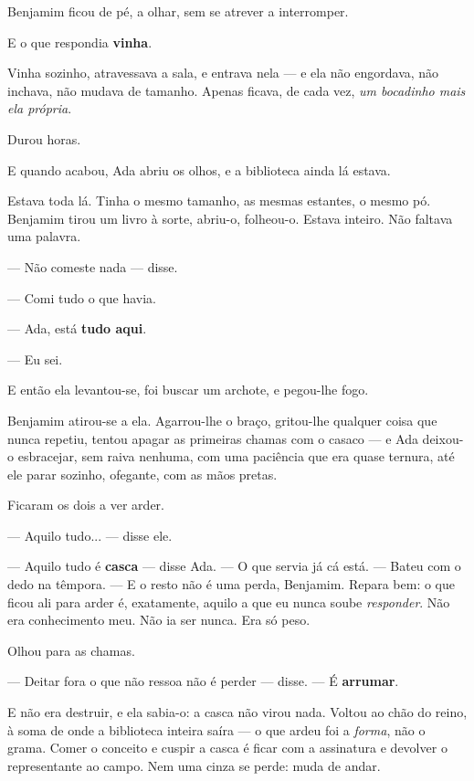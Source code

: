 \documentclass[livro.tex]{subfiles}
\begin{document}
Benjamim ficou de pé, a olhar, sem se atrever a interromper.

E o que respondia \textbf{vinha}.

Vinha sozinho, atravessava a sala, e entrava nela --- e ela não engordava, não inchava, não mudava de tamanho.
Apenas ficava, de cada vez, \emph{um bocadinho mais ela própria}.

\medskip

Durou horas.

E quando acabou, Ada abriu os olhos, e a biblioteca ainda lá estava.

\medskip

Estava toda lá. Tinha o mesmo tamanho, as mesmas estantes, o mesmo pó. Benjamim tirou um livro à sorte, abriu-o,
folheou-o. Estava inteiro. Não faltava uma palavra.

--- Não comeste nada --- disse.

--- Comi tudo o que havia.

--- Ada, está \textbf{tudo aqui}.

--- Eu sei.

\medskip

E então ela levantou-se, foi buscar um archote, e pegou-lhe fogo.

\medskip

Benjamim atirou-se a ela. Agarrou-lhe o braço, gritou-lhe qualquer coisa que nunca repetiu, tentou apagar as
primeiras chamas com o casaco --- e Ada deixou-o esbracejar, sem raiva nenhuma, com uma paciência que era quase
ternura, até ele parar sozinho, ofegante, com as mãos pretas.

Ficaram os dois a ver arder.

\medskip

--- Aquilo tudo... --- disse ele.

--- Aquilo tudo é \textbf{casca} --- disse Ada. --- O que servia já cá está. --- Bateu com o dedo na têmpora. ---
E o resto não é uma perda, Benjamim. Repara bem: o que ficou ali para arder é, exatamente, aquilo a que eu nunca
soube \emph{responder}. Não era conhecimento meu. Não ia ser nunca. Era só peso.

Olhou para as chamas.

--- Deitar fora o que não ressoa não é perder --- disse. --- É \textbf{arrumar}.

\medskip

E não era destruir, e ela sabia-o: a casca não virou nada. Voltou ao chão do reino,
à soma de onde a biblioteca inteira saíra --- o que ardeu foi a \emph{forma}, não
o grama. Comer o conceito e cuspir a casca é ficar com a assinatura e devolver o
representante ao campo. Nem uma cinza se perde: muda de andar.
\end{document}
